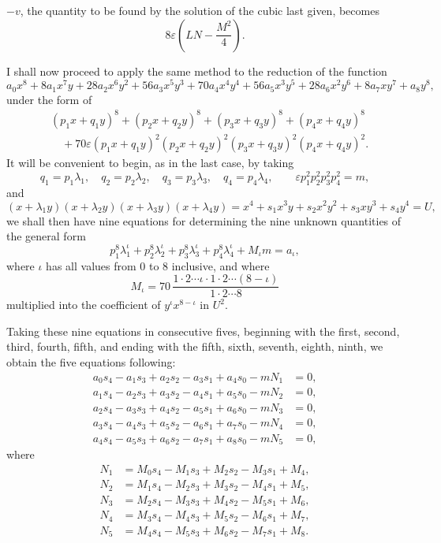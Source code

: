 \documentclass[11pt]{article}
\newcommand{\sourcepage}[1]{\marginpar{\scriptsize p.~#1}}
\begin{document}
\sourcepage{271}
$-v$, the quantity to be found by the solution of the cubic last given, becomes
\[
8\varepsilon\left(LN-\frac{M^2}{4}\right).
\]

I shall now proceed to apply the same method to the reduction of the function
\[
a_0x^8+8a_1x^7y+28a_2x^6y^2+56a_3x^5y^3+70a_4x^4y^4+56a_5x^3y^5
+28a_6x^2y^6+8a_7xy^7+a_8y^8,
\]
under the form of
\[
\begin{aligned}
&(p_1x+q_1y)^8+(p_2x+q_2y)^8+(p_3x+q_3y)^8+(p_4x+q_4y)^8\\
&\quad +70\varepsilon(p_1x+q_1y)^2(p_2x+q_2y)^2(p_3x+q_3y)^2(p_4x+q_4y)^2.
\end{aligned}
\]
It will be convenient to begin, as in the last case, by taking
\[
q_1=p_1\lambda_1,\quad q_2=p_2\lambda_2,\quad q_3=p_3\lambda_3,\quad q_4=p_4\lambda_4,\qquad
\varepsilon p_1^2p_2^2p_3^2p_4^2=m,
\]
and
\[
(x+\lambda_1y)(x+\lambda_2y)(x+\lambda_3y)(x+\lambda_4y)
=x^4+s_1x^3y+s_2x^2y^2+s_3xy^3+s_4y^4=U,
\]
we shall then have nine equations for determining the nine unknown quantities of the general form
\[
p_1^8\lambda_1^\iota+p_2^8\lambda_2^\iota+p_3^8\lambda_3^\iota+p_4^8\lambda_4^\iota+M_\iota m=a_\iota,
\]
where $\iota$ has all values from 0 to 8 inclusive, and where
\[
M_\iota=70\,\frac{1\cdot2\cdots\iota\cdot1\cdot2\cdots(8-\iota)}{1\cdot2\cdots8}
\]
multiplied into the coefficient of $y^\iota x^{8-\iota}$ in $U^2$.

Taking these nine equations in consecutive fives, beginning with the first, second, third, fourth, fifth, and ending with the fifth, sixth, seventh, eighth, ninth, we obtain the five equations following:
\[
\begin{aligned}
a_0s_4-a_1s_3+a_2s_2-a_3s_1+a_4s_0-mN_1&=0,\\
a_1s_4-a_2s_3+a_3s_2-a_4s_1+a_5s_0-mN_2&=0,\\
a_2s_4-a_3s_3+a_4s_2-a_5s_1+a_6s_0-mN_3&=0,\\
a_3s_4-a_4s_3+a_5s_2-a_6s_1+a_7s_0-mN_4&=0,\\
a_4s_4-a_5s_3+a_6s_2-a_7s_1+a_8s_0-mN_5&=0,
\end{aligned}
\]
where
\[
\begin{aligned}
N_1&=M_0s_4-M_1s_3+M_2s_2-M_3s_1+M_4,\\
N_2&=M_1s_4-M_2s_3+M_3s_2-M_4s_1+M_5,\\
N_3&=M_2s_4-M_3s_3+M_4s_2-M_5s_1+M_6,\\
N_4&=M_3s_4-M_4s_3+M_5s_2-M_6s_1+M_7,\\
N_5&=M_4s_4-M_5s_3+M_6s_2-M_7s_1+M_8.
\end{aligned}
\]
\end{document}
